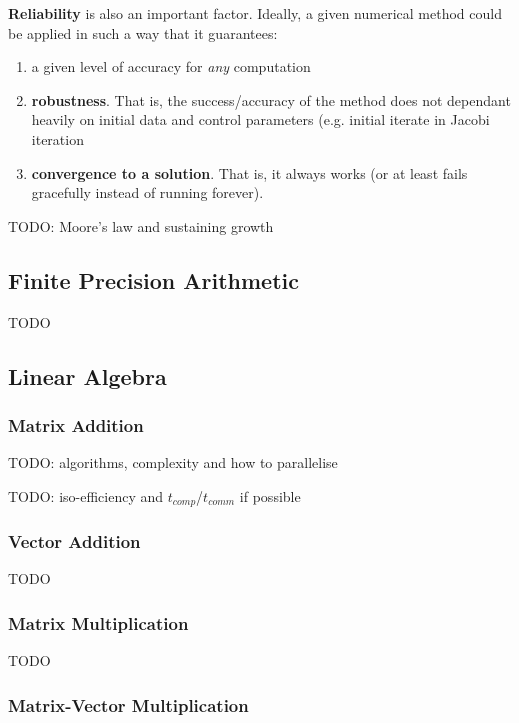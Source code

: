 \documentclass{article}
\begin{document}
\textbf{Reliability} is also an important factor. Ideally, a given numerical method could be applied in such a way that it guarantees:
\begin{enumerate}
	\item a given level of accuracy for \textit{any} computation
	\item \textbf{robustness}. That is, the success/accuracy of the method does not dependant heavily on initial data and control parameters (e.g. initial iterate in Jacobi iteration
	\item \textbf{convergence to a solution}. That is, it always works (or at least fails gracefully instead of running forever).
	
\end{enumerate}

TODO: Moore's law and sustaining growth

\subsection{Finite Precision Arithmetic}

TODO

\subsection{Linear Algebra}

\subsubsection{Matrix Addition}

TODO: algorithms, complexity and how to parallelise

TODO: iso-efficiency and $t_{comp}$/$t_{comm}$ if possible

\subsubsection{Vector Addition}

TODO

\subsubsection{Matrix Multiplication}

TODO

\subsubsection{Matrix-Vector Multiplication}
\end{document}
